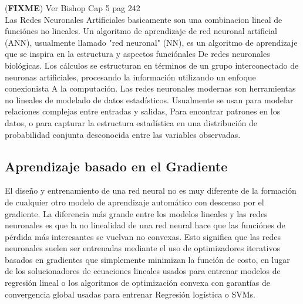 \documentclass[a4paper,11pt,spanish]{book}
\newcommand*{\FIXME}[1]{{(\textbf{FIXME}) {#1}}}
\begin{document}

      \FIXME{Ver Bishop Cap 5 pag 242}\\
      Las Redes Neuronales Artificiales basicamente son una combinacion lineal de funciónes no lineales.
      Un algoritmo de aprendizaje de red neuronal artificial (ANN), usualmente llamado "red neuronal" (NN), es un algoritmo de aprendizaje que se inspira en la estructura y aspectos funciónales
      De redes neuronales biológicas. Los cálculos se estructuran en términos de un grupo interconectado de neuronas artificiales, procesando la información utilizando un enfoque conexionista
      A la computación. Las redes neuronales modernas son herramientas no lineales de modelado de datos estadísticos. Usualmente se usan para modelar relaciones complejas entre entradas y salidas,
      Para encontrar patrones en los datos, o para capturar la estructura estadística en una distribución de probabilidad conjunta desconocida entre las variables observadas.
      
      \subsection{Aprendizaje basado en el Gradiente}
	El diseño y entrenamiento de una red neural no es muy diferente de la formación de cualquier otro modelo de aprendizaje automático con descenso por el gradiente.
	La diferencia más grande entre los modelos lineales y las redes neuronales es que la no linealidad de una red neural hace que las funciónes de pérdida 
	más interesantes se vuelvan no convexas. Esto significa que las redes neuronales suelen ser entrenadas mediante el uso de optimizadores iterativos basados ​​en gradientes 
	que simplemente minimizan la función de costo, en lugar de los solucionadores de ecuaciones lineales usados ​​para entrenar modelos de regresión lineal o los algoritmos de optimización 
	convexa con garantías de convergencia global usadas para entrenar Regresión logística o SVMs.
      
\end{document}
